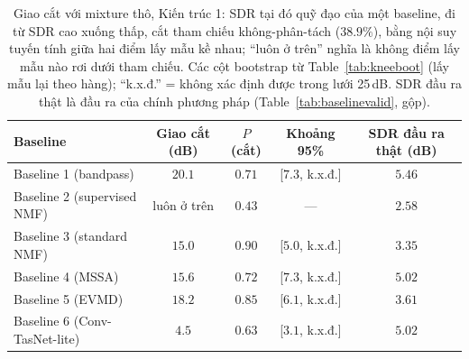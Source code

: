 \documentclass[11pt]{article}
\begin{document}
\begin{table}[H]
\centering
\caption{Giao cắt với mixture thô, Kiến trúc 1: SDR tại đó quỹ đạo của một baseline, đi từ SDR cao xuống thấp, cắt tham chiếu không-phân-tách ($38.9\%$), bằng nội suy tuyến tính giữa hai điểm lấy mẫu kề nhau; ``luôn ở trên'' nghĩa là không điểm lấy mẫu nào rơi dưới tham chiếu. Các cột bootstrap từ Table~\ref{tab:kneeboot} (lấy mẫu lại theo hàng); ``k.x.đ.'' = không xác định được trong lưới 25\,dB. SDR đầu ra thật là đầu ra của chính phương pháp (Table~\ref{tab:baselinevalid}, gộp).}
\label{tab:knee}
\begin{tabular}{@{}lcccc@{}}
\toprule
Baseline & Giao cắt (dB) & $P$(cắt) & Khoảng 95\% & SDR đầu ra thật (dB) \\
\midrule
Baseline 1 (bandpass)         & $20.1$ & $0.71$ & [$7.3$, k.x.đ.] & $5.46$ \\
Baseline 2 (supervised NMF)   & luôn ở trên & $0.43$ & --- & $2.58$ \\
Baseline 3 (standard NMF)     & $15.0$ & $0.90$ & [$5.0$, k.x.đ.] & $3.35$ \\
Baseline 4 (MSSA)             & $15.6$ & $0.72$ & [$7.3$, k.x.đ.] & $5.02$ \\
Baseline 5 (EVMD)             & $18.2$ & $0.85$ & [$6.1$, k.x.đ.] & $3.61$ \\
Baseline 6 (Conv-TasNet-lite) & $4.5$  & $0.63$ & [$3.1$, k.x.đ.] & $5.02$ \\
\bottomrule
\end{tabular}
\end{table}
\end{document}
